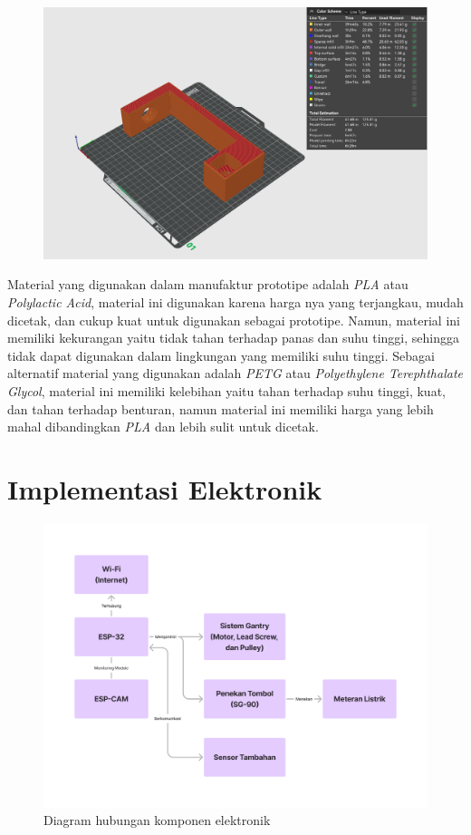 \begin{figure}[H]
  \centering
  \includegraphics[width=0.7\linewidth]{gambar/bambu-studio.png}
  \caption{}
  \label{fig:hasil-prototipe-2}
\end{figure}

Material yang digunakan dalam manufaktur prototipe adalah \textit{PLA} atau \textit{Polylactic Acid},
material ini digunakan karena harga nya yang terjangkau, mudah dicetak, dan cukup kuat untuk digunakan
sebagai prototipe. Namun, material ini memiliki kekurangan yaitu tidak tahan terhadap panas dan
suhu tinggi, sehingga tidak dapat digunakan dalam lingkungan yang memiliki suhu tinggi. Sebagai 
alternatif material yang digunakan adalah \textit{PETG} atau \textit{Polyethylene Terephthalate Glycol},
material ini memiliki kelebihan yaitu tahan terhadap suhu tinggi, kuat, dan tahan terhadap benturan,
namun material ini memiliki harga yang lebih mahal dibandingkan \textit{PLA} dan lebih sulit untuk
dicetak.

\section{Implementasi Elektronik}

\begin{figure}[H]
  \centering
  \includegraphics[width=1\linewidth]{gambar/implementasi-elektronik.png}
  \caption{Diagram hubungan komponen elektronik}
  \label{fig:implementasi-elektronik}
\end{figure}

